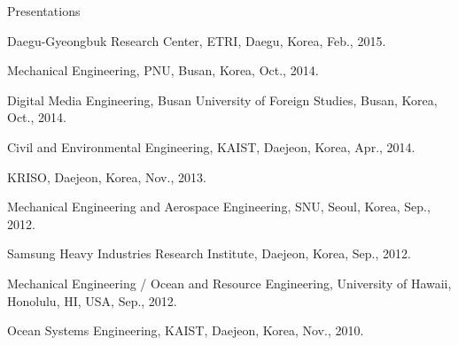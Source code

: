 \begin{rSection}{Presentations}
\begin{pubSubsectionNum}{}
  \item Daegu-Gyeongbuk Research Center, \ac{ETRI}, Daegu, Korea, Feb., 2015.
  \item Mechanical Engineering, \ac{PNU}, Busan, Korea, Oct., 2014.
  \item Digital Media Engineering, Busan University of Foreign Studies, Busan, Korea, Oct., 2014.
  \item Civil and Environmental Engineering, \ac{KAIST}, Daejeon, Korea, Apr., 2014.
  \item \ac{KRISO}, Daejeon, Korea, Nov., 2013.
  \item Mechanical Engineering and Aerospace Engineering, \ac{SNU}, Seoul, Korea, Sep., 2012.
  \item Samsung Heavy Industries Research Institute, Daejeon, Korea, Sep., 2012.
  \item Mechanical Engineering / Ocean and Resource Engineering, University of Hawaii, Honolulu, HI, USA, Sep., 2012.
  \item Ocean Systems Engineering, \ac{KAIST}, Daejeon, Korea, Nov., 2010.
\end{pubSubsectionNum}

\end{rSection}
